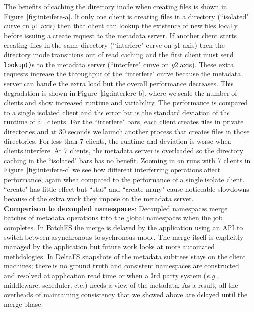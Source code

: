 The benefits of caching the directory inode when creating files is shown in
Figure~\ref{fig:interfere-a}.  If only one client is creating files in a
directory (``isolated" curve on \(y1\) axis) then that client can lookup the
existence of new files locally before issuing a create request to the metadata
server. If another client starts creating files in the same directory
(``interfere" curve on \(y1\) axis) then the directory inode transitions out of
read caching and the first client must send \texttt{lookup()}s to the metadata
server (``interfere" curve on \(y2\) axis). These extra requests increase the
throughput of the ``interfere" curve because the metadata server can handle the
extra load but the overall performance decreases.  This degradation is shown in
Figure~\ref{fig:interfere-b}, where we scale the number of clients and show
increased runtime and variability. The performance is compared to a single
isolated client and the error bar is the standard deviation of the runtime of
all clients.  For the ``interfere" bars, each client creates files in private
directories and at 30 seconds we launch another process that creates files in
those directories.  For less than 7 clients, the runtime and deviation is worse
when clients interfere. At 7 clients, the metadata server is overloaded so the
directory caching in the ``isolated" bars has no benefit. Zooming in on runs
with 7 clients in Figure~\ref{fig:interfere-c} we see how different
interferring operations affect performance, again when compared to the
performance of a single isolate client.  ``create" has little effect but
``stat" and ``create many" cause noticeable slowdowns because of the extra work
they impose on the metadata server.\\


\noindent\textbf{Comparison to decoupled namespaces}: Decoupled namespaces
merge batches of metadata operations into the global namespaces when the job
completes.  In BatchFS the merge is delayed by the application using an API to
switch between asynchronous to sychronous mode. The merge itself is explicitly
managed by the application but future work looks at more automated
methdologies. In DeltaFS snapshots of the metadata subtrees stays on the client
machines; there is no ground truth and consistent namespaces are constructed
and resolved at application read time or when a 3rd party system ({\it e.g.},
middleware, scheduler, etc.) needs a view of the metadata. As a result, all the
overheads of maintaining consistency that we showed above are delayed until the
merge phase.

